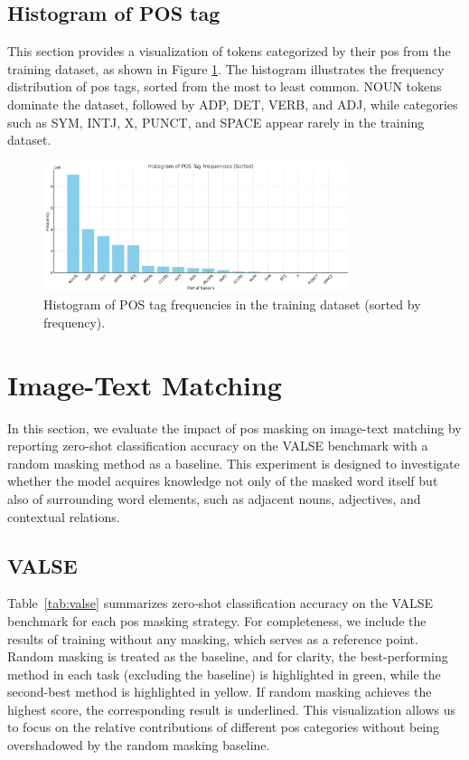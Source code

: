 \subsection{Histogram of POS tag}
This section provides a visualization of tokens categorized by their \acrshort{pos} from the training dataset, as shown in Figure \ref{fig:pos_count}.
The histogram illustrates the frequency distribution of \acrshort{pos} tags, sorted from the most to least common.
NOUN tokens dominate the dataset, followed by ADP, DET, VERB, and ADJ, while categories such as SYM, INTJ, X, PUNCT, and SPACE appear rarely in the training dataset.

\begin{figure}[H]
    \caption{Histogram of POS tag frequencies in the training dataset (sorted by frequency).}
    \label{fig:pos_count}
    \centering
    \includegraphics[width=0.8\textwidth]{Images/graph/pos_count.png}
\end{figure}

\section{Image-Text Matching}
In this section, we evaluate the impact of \acrshort{pos} masking on image-text matching by reporting zero-shot classification accuracy on the VALSE benchmark with a random masking method as a baseline.
This experiment is designed to investigate whether the model acquires knowledge not only of the masked word itself but also of surrounding word elements, such as adjacent nouns, adjectives, and contextual relations.

\subsection{VALSE}
Table~\ref{tab:valse} summarizes zero‐shot classification accuracy on the VALSE benchmark for each \acrshort{pos} masking strategy.
For completeness, we include the results of training without any masking, which serves as a reference point.
Random masking is treated as the baseline, and for clarity, the best-performing method in each task (excluding the baseline) is highlighted in green, while the second-best method is highlighted in yellow.
If random masking achieves the highest score, the corresponding result is underlined.
This visualization allows us to focus on the relative contributions of different \acrshort{pos} categories without being overshadowed by the random masking baseline.

